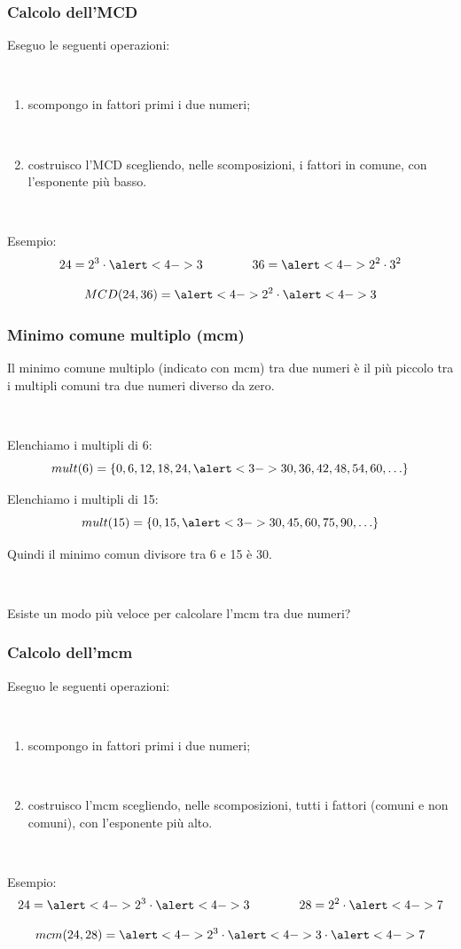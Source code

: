 \documentclass[]{beamer}
\theoremstyle{plain}
\begin{document}
\begin{frame}
\frametitle{Calcolo dell'MCD}
Eseguo le seguenti operazioni:

~

\begin{enumerate}
  \item \alert{scompongo in fattori primi} i due numeri;\pause
  
  ~
  \item costruisco l'MCD scegliendo, nelle scomposizioni, \alert{i fattori in comune, con l'esponente più basso}.\pause
\end{enumerate}

~

Esempio:\[24 = 2^3 \cdot \alert<4->{3} \qquad\qquad 36 = \alert<4->{2^2} \cdot 3^2 \]\pause

\[ MCD(24, 36) = \alert<4->{2^2} \cdot \alert<4->{3} \]
\end{frame}

\begin{frame}
\frametitle{Minimo comune multiplo (mcm)}
Il minimo comune multiplo (indicato con mcm) tra due numeri è \alert{il più piccolo tra i multipli comuni tra due numeri} diverso da zero.\pause

~

Elenchiamo i multipli di 6:
\[mult(6) = \{ 0, 6, 12, 18, 24, \alert<3->{30}, 36, 42, 48, 54, 60, \ldots \}\]\pause

Elenchiamo i multipli di 15:
\[mult(15) = \{ 0, 15, \alert<3->{30}, 45, 60, 75, 90, \ldots \}\]\pause

Quindi il minimo comun divisore tra 6 e 15 è 30.\pause

~

Esiste un modo più veloce per calcolare l'mcm tra due numeri?
\end{frame}


\begin{frame}
\frametitle{Calcolo dell'mcm}
Eseguo le seguenti operazioni:

~

\begin{enumerate}
  \item \alert{scompongo in fattori primi} i due numeri;\pause
  
  ~
  \item costruisco l'mcm scegliendo, nelle scomposizioni, \alert{tutti i fattori (comuni e non comuni), con l'esponente più alto}.\pause
\end{enumerate}

~

Esempio:\[24 = \alert<4->{2^3} \cdot \alert<4->{3} \qquad\qquad 28 = 2^2 \cdot \alert<4->{7} \]\pause

\[ mcm(24, 28) = \alert<4->{2^3} \cdot \alert<4->{3} \cdot \alert<4->{7} \]
\end{frame}
\end{document}
